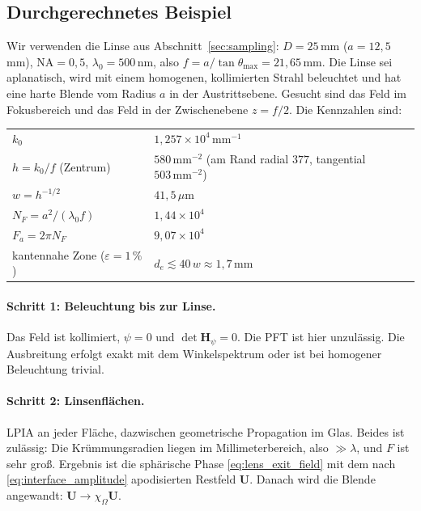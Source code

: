 \documentclass[11pt,a4paper]{scrartcl}
\theoremstyle{insightstyle}
\newcommand{\Hess}{\bm{H}}
\newcommand{\NA}{\mathrm{NA}}
\begin{document}
\subsection{Durchgerechnetes Beispiel}\label{sec:example}
Wir verwenden die Linse aus Abschnitt~\ref{sec:sampling}: $D=25\,$mm ($a=12{,}5\,$mm), $\NA=0{,}5$, $\lambda_0=500\,$nm, also $f=a/\tan\theta_{\max}=21{,}65\,$mm. Die Linse sei aplanatisch, wird mit einem homogenen, kollimierten Strahl beleuchtet und hat eine harte Blende vom Radius $a$ in der Austrittsebene. Gesucht sind das Feld im Fokusbereich und das Feld in der Zwischenebene $z=f/2$. Die Kennzahlen sind:
\begin{center}
\small
\begin{tabular}{ll}
\toprule
$k_0$ & $1{,}257\times10^4\,\text{mm}^{-1}$\\
$h=k_0/f$ (Zentrum) & $580\,\text{mm}^{-2}$ (am Rand radial $377$, tangential $503\,\text{mm}^{-2}$)\\
$w=h^{-1/2}$ & $41{,}5\,\mu$m\\
$N_F=a^2/(\lambda_0f)$ & $1{,}44\times10^4$\\
$F_a=2\pi N_F$ & $9{,}07\times10^4$\\
kantennahe Zone ($\varepsilon=1\,\%$) & $d_e\lesssim40\,w\approx1{,}7\,$mm\\
\bottomrule
\end{tabular}
\end{center}

\paragraph{Schritt 1: Beleuchtung bis zur Linse.} Das Feld ist kollimiert, $\psi=0$ und $\det\Hess_\psi=0$. Die PFT ist hier unzulässig. Die Ausbreitung erfolgt exakt mit dem Winkelspektrum oder ist bei homogener Beleuchtung trivial.

\paragraph{Schritt 2: Linsenflächen.} LPIA an jeder Fläche, dazwischen geometrische Propagation im Glas. Beides ist zulässig: Die Krümmungsradien liegen im Millimeterbereich, also $\gg\lambda$, und $F$ ist sehr groß. Ergebnis ist die sphärische Phase \eqref{eq:lens_exit_field} mit dem nach \eqref{eq:interface_amplitude} apodisierten Restfeld $\bm U$. Danach wird die Blende angewandt: $\bm U\to\chi_\Omega\bm U$.
\end{document}
